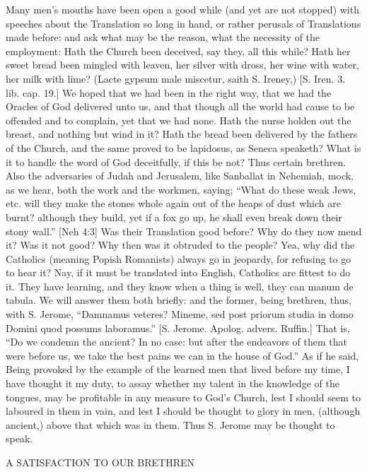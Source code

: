 {\par }{\IP Many men’s mouths have been open a good while (and yet are not stopped) with speeches about the Translation so long in hand, or rather perusals of Translations made before: and ask what may be the reason, what the necessity of the employment: Hath the Church been deceived, say they, all this while? Hath her sweet bread been mingled with leaven, her silver with dross, her wine with water, her milk with lime? (Lacte gypsum male miscetur, saith S. Ireney,) [S. Iren. 3. lib. cap. 19.] We hoped that we had been in the right way, that we had the Oracles of God delivered unto us, and that though all the world had cause to be offended and to complain, yet that we had none. Hath the nurse holden out the breast, and nothing but wind in it? Hath the bread been delivered by the fathers of the Church, and the same proved to be lapidosus, as Seneca speaketh? What is it to handle the word of God deceitfully, if this be not? Thus certain brethren. Also the adversaries of Judah and Jerusalem, like Sanballat in Nehemiah, mock, as we hear, both the work and the workmen, saying; “What do these weak Jews, etc. will they make the stones whole again out of the heaps of dust which are burnt? although they build, yet if a fox go up, he shall even break down their stony wall.” [Neh 4:3] Was their Translation good before? Why do they now mend it? Was it not good? Why then was it obtruded to the people? Yea, why did the Catholics (meaning Popish Romanists) always go in jeopardy, for refusing to go to hear it? Nay, if it must be translated into English, Catholics are fittest to do it. They have learning, and they know when a thing is well, they can manum de tabula. We will answer them both briefly: and the former, being brethren, thus, with S. Jerome, “Damnamus veteres? Mineme, sed post priorum studia in domo Domini quod possums laboramus.” [S. Jerome. Apolog. advers. Ruffin.] That is, “Do we condemn the ancient? In no case: but after the endeavors of them that were before us, we take the best pains we can in the house of God.” As if he said, Being provoked by the example of the learned men that lived before my time, I have thought it my duty, to assay whether my talent in the knowledge of the tongues, may be profitable in any measure to God’s Church, lest I should seem to laboured in them in vain, and lest I should be thought to glory in men, (although ancient,) above that which was in them. Thus S. Jerome may be thought to speak.
\par }{\IS A SATISFACTION TO OUR BRETHREN
}

